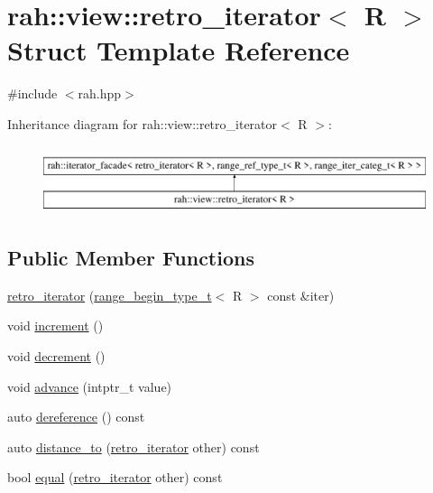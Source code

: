 \hypertarget{structrah_1_1view_1_1retro__iterator}{}\section{rah\+::view\+::retro\+\_\+iterator$<$ R $>$ Struct Template Reference}
\label{structrah_1_1view_1_1retro__iterator}


{\ttfamily \#include $<$rah.\+hpp$>$}

Inheritance diagram for rah\+::view\+::retro\+\_\+iterator$<$ R $>$\+:\begin{figure}[H]
\begin{center}
\leavevmode
\includegraphics[height=2.000000cm]{structrah_1_1view_1_1retro__iterator}
\end{center}
\end{figure}
\subsection*{Public Member Functions}
\begin{DoxyCompactItemize}
\item 
\mbox{\hyperlink{structrah_1_1view_1_1retro__iterator_ad7369163c4bbabf1e8699fd5ec8f96c8}{retro\+\_\+iterator}} (\mbox{\hyperlink{namespacerah_a28aff4eeddcece6be65ff0b956d32d4a}{range\+\_\+begin\+\_\+type\+\_\+t}}$<$ R $>$ const \&iter)
\item 
void \mbox{\hyperlink{structrah_1_1view_1_1retro__iterator_a22d7931c285c8d3b3e1e91146783bba9}{increment}} ()
\item 
void \mbox{\hyperlink{structrah_1_1view_1_1retro__iterator_a8da10018776a90937b78433b85a73330}{decrement}} ()
\item 
void \mbox{\hyperlink{structrah_1_1view_1_1retro__iterator_a5f70f5e51fe8e6c47cbeac7c8fa2a9d2}{advance}} (intptr\+\_\+t value)
\item 
auto \mbox{\hyperlink{structrah_1_1view_1_1retro__iterator_a056244974e69e84f1a31ab82e115ba46}{dereference}} () const
\item 
auto \mbox{\hyperlink{structrah_1_1view_1_1retro__iterator_a35d2fd256c7fe08dffeba98014627952}{distance\+\_\+to}} (\mbox{\hyperlink{structrah_1_1view_1_1retro__iterator}{retro\+\_\+iterator}} other) const
\item 
bool \mbox{\hyperlink{structrah_1_1view_1_1retro__iterator_ad06ccb4d1bbf30f343a168ae8f4d6dde}{equal}} (\mbox{\hyperlink{structrah_1_1view_1_1retro__iterator}{retro\+\_\+iterator}} other) const
\end{DoxyCompactItemize}

